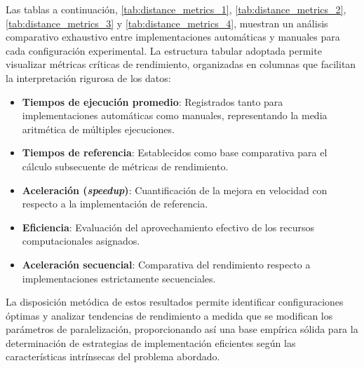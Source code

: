         Las tablas a continuación, \autoref{tab:distance_metrics_1}, \autoref{tab:distance_metrics_2}, \autoref{tab:distance_metrics_3} y \autoref{tab:distance_metrics_4}, muestran un análisis comparativo exhaustivo entre implementaciones automáticas y manuales para cada configuración experimental. La estructura tabular adoptada permite visualizar métricas críticas de rendimiento, organizadas en columnas que facilitan la interpretación rigurosa de los datos:

        \begin{itemize}
        
            \item \textbf{Tiempos de ejecución promedio}: Registrados tanto para implementaciones automáticas como manuales, representando la media aritmética de múltiples ejecuciones.
            
            \item \textbf{Tiempos de referencia}: Establecidos como base comparativa para el cálculo subsecuente de métricas de rendimiento.
            
            \item \textbf{Aceleración (\textit{speedup})}: Cuantificación de la mejora en velocidad con respecto a la implementación de referencia.
            
            \item \textbf{Eficiencia}: Evaluación del aprovechamiento efectivo de los recursos computacionales asignados.
            
            \item \textbf{Aceleración secuencial}: Comparativa del rendimiento respecto a implementaciones estrictamente secuenciales.

        \end{itemize}
        
        La disposición metódica de estos resultados permite identificar configuraciones óptimas y analizar tendencias de rendimiento a medida que se modifican los parámetros de paralelización, proporcionando así una base empírica sólida para la determinación de estrategias de implementación eficientes según las características intrínsecas del problema abordado.


